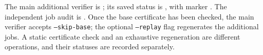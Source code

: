 The main additional verifier is ; its saved status is , with marker . The independent job audit is . Once the base certificate has been checked, the main verifier accepts \texttt{--skip-base}; the optional \texttt{--replay} flag regenerates the additional jobs. A static certificate check and an exhaustive regeneration are different operations, and their statuses are recorded separately.
